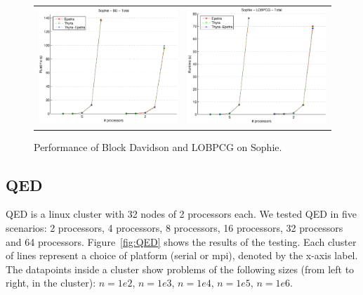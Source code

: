 \documentclass[10pt]{article}
\begin{document}
\begin{figure}[htp]
\begin{tabular}{cc}
\includegraphics[width=2.50in]{results/sophie/Sophie-BD-Total_ln.eps} &
\includegraphics[width=2.50in]{results/sophie/Sophie-LOBPCG-Total_ln.eps} 
\end{tabular}
\caption{Performance of Block Davidson and LOBPCG on Sophie.}
\label{fig:Sophie}
\end{figure}


\subsection{QED}

QED is a linux cluster with 32 nodes of 2 processors each. We tested QED in five
scenarios: 2 processors, 4 processors, 8 processors, 16 processors, 32
processors and 64 processors. Figure~\ref{fig:QED} shows the results of
the testing. Each cluster of lines represent a choice of platform (serial or mpi), denoted
by the x-axis label. The datapoints inside a cluster show problems of the following sizes
(from left to right, in the cluster): $n=1e2$, $n=1e3$, $n=1e4$, $n=1e5$, $n=1e6$.
\end{document}
